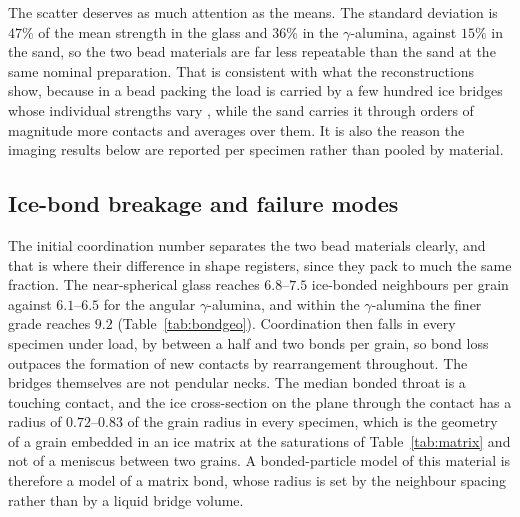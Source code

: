 \documentclass[preprint,12pt,numbers]{elsarticle}
\begin{document}
  The scatter deserves as much attention as the means.  The standard deviation
  is $47\%$ of the mean strength in the glass and $36\%$ in the
  $\gamma$-alumina, against $15\%$ in the sand, so the two bead materials are
  far less repeatable than the sand at the same nominal preparation.  That is
  consistent with what the reconstructions show, because in a bead packing the
  load is carried by a few hundred ice bridges whose individual strengths vary
  \cite{Kirsch2011}, while the sand carries it through orders of magnitude more
  contacts and averages over them.  It is also the reason the imaging results
  below are reported per specimen rather than pooled by material.

  \subsection{Ice-bond breakage and failure modes}
  \label{sec:res_bonds}

  The initial coordination number separates the two bead materials clearly,
  and that is where their difference in shape registers, since they pack to
  much the same fraction.  The near-spherical glass reaches $6.8$--$7.5$
  ice-bonded neighbours per grain against $6.1$--$6.5$ for the angular
  $\gamma$-alumina, and within the $\gamma$-alumina the finer grade reaches
  $9.2$ (Table~\ref{tab:bondgeo}).  Coordination then falls in every
  specimen under load, by between a half and two bonds per grain, so bond loss outpaces the
  formation of new contacts by rearrangement throughout.  The bridges
  themselves are not pendular necks.  The median bonded throat is a touching
  contact, and the ice cross-section on the plane through the contact has a
  radius of $0.72$--$0.83$ of the grain radius in every specimen, which is the
  geometry of a grain embedded in an ice matrix at the saturations of
  Table~\ref{tab:matrix} and not of a meniscus between two grains.  A
  bonded-particle model of this material is therefore a model of a matrix
  bond, whose radius is set by the neighbour spacing rather than by a liquid
  bridge volume.
\end{document}
